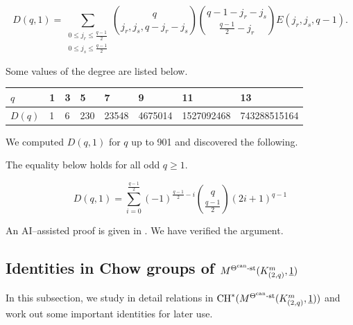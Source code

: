 \documentclass[11pt]{article}
\begin{document}
\begin{example}
    \[
    D(q, 1) = \sum_{\substack{0\leq j_r\leq \frac{q-1}{2}\\0\leq j_s\leq \frac{q-1}{2}}}\binom{q}{j_r, j_s, q-j_r-j_s}\binom{q-1-j_r-j_s}{\frac{q-1}{2}-j_r}E(j_r, j_s, q-1).
    \]

    Some values of the degree are listed below.

        \begin{table}[H]
            \centering
            \begin{tabular}{|l|l|l|l|l|l|l|l|}
            \hline
            \(q\)    & 1 & 3 & 5   & 7     & 9       & 11  & 13        \\
            \hline
            \(D(q)\) & 1 & 6 & 230 & 23548 & 4675014 & 1527092468 & 743288515164\\ 
            \hline
            \end{tabular}
        \end{table}

\end{example}

We computed \(D(q, 1)\) for \(q\) up to 901 and discovered the following. 

\begin{conjecture}\label{Conjecture:deg-macmahon}
    The equality below holds for all odd \(q\geq 1\).

    \[
    D(q, 1) = \sum_{i = 0}^{\frac{q-1}{2}}(-1)^{\frac{q-1}{2}-i}\binom{q}{\frac{q-1}{2}}(2i + 1)^{q-1}
    \]
\end{conjecture}

\begin{remark}
    An AI--assisted proof is given in . We have verified the argument.
\end{remark}

\subsection{Identities in Chow groups of \texorpdfstring{\(M^{\Theta^{\text{can}}\text{-st}}(K_{(2,q)}^m, \underline{1})\)}{M(K2qm, 1)}}\label{Subsection:4-2}

In this subsection, we study in detail relations in \(\mathrm{CH}^*(M^{\Theta^{\text{can}}\text{-st}}(K_{(2,q)}^m, \underline{1}))\) and work out some important identities for later use. 
\end{document}
